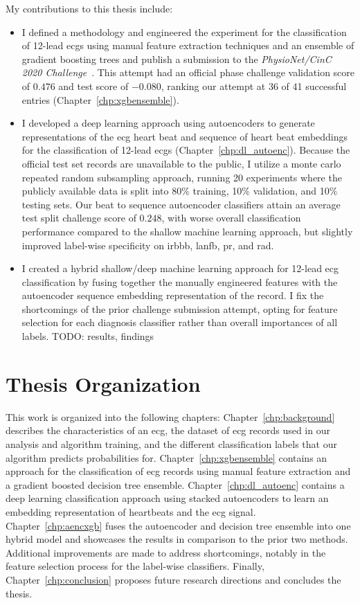 \documentclass[\main/thesis.tex]{subfiles}
\begin{document}
My contributions to this thesis include:
\begin{itemize}
    \item I defined a methodology and engineered the experiment for the classification of 12-lead \gls{ecg}s using manual feature extraction techniques and an ensemble of gradient boosting trees and publish a submission to the \emph{PhysioNet/CinC 2020 Challenge}~\cite{physionet_challenge_2020}.
    This attempt had an official phase challenge validation score of $0.476$ and test score of $-0.080$, ranking our attempt at 36 of 41 successful entries (Chapter~\ref{chp:xgbensemble}).
    \item I developed a deep learning approach using autoencoders to generate representations of the \gls{ecg} heart beat and sequence of heart beat embeddings for the classification of 12-lead \gls{ecg}s (Chapter~\ref{chp:dl_autoenc}).
    Because the official test set records are unavailable to the public, I utilize a monte carlo repeated random subsampling approach, running 20 experiments where the publicly available data is split into 80\% training, 10\% validation, and 10\% testing sets.
    Our beat to sequence autoencoder classifiers attain an average test split challenge score of $0.248$, with worse overall classification performance compared to the shallow machine learning approach, but slightly improved label-wise specificity on \acrlong{irbbb}, \acrlong{lanfb}, \acrlong{pr}, and \acrlong{rad}.
    \item I created a hybrid shallow/deep machine learning approach for 12-lead \gls{ecg} classification by fusing together the manually engineered features with the autoencoder sequence embedding representation of the record.
    I fix the shortcomings of the prior challenge submission attempt, opting for feature selection for each diagnosis classifier rather than overall importances of all labels.
    TODO: results, findings
\end{itemize}

\section{Thesis Organization}

This work is organized into the following chapters:
Chapter~\ref{chp:background} describes the characteristics of an \gls{ecg}, the dataset of \gls{ecg} records used in our analysis and algorithm training, and the different classification labels that our algorithm predicts probabilities for.
Chapter~\ref{chp:xgbensemble} contains an approach for the classification of \gls{ecg} records using manual feature extraction and a gradient boosted decision tree ensemble.
Chapter~\ref{chp:dl_autoenc} contains a deep learning classification approach using stacked autoencoders to learn an embedding representation of heartbeats and the \gls{ecg} signal.
Chapter~\ref{chp:aencxgb} fuses the autoencoder and decision tree ensemble into one hybrid model and showcases the results in comparison to the prior two methods. Additional improvements are made to address shortcomings, notably in the feature selection process for the label-wise classifiers.
Finally, Chapter~\ref{chp:conclusion} proposes future research directions and concludes the thesis.
\end{document}
